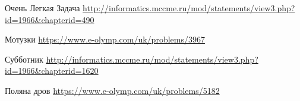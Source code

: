 \documentclass{beamer}
\begin{document}
\begin{frame}{Очень Легкая Задача}
\url{http://informatics.mccme.ru/mod/statements/view3.php?id=1966&chapterid=490}
\end{frame}


\begin{frame}{Мотузки}
\url{https://www.e-olymp.com/uk/problems/3967}
\end{frame}

\begin{frame}{Субботник}
\url{http://informatics.mccme.ru/mod/statements/view3.php?id=1966&chapterid=1620}
\end{frame}


\begin{frame}{Поляна дров}
\url{https://www.e-olymp.com/uk/problems/5182}
\end{frame}
\end{document}
